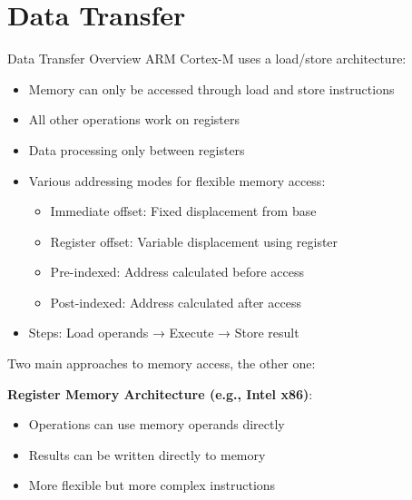 \section{Data Transfer}

\begin{concept}{Data Transfer Overview}
ARM Cortex-M uses a load/store architecture:
\begin{itemize}
  \item Memory can only be accessed through load and store instructions
  \item All other operations work on registers
  \item Data processing only between registers
  \item Various addressing modes for flexible memory access:
    \begin{itemize}
      \item Immediate offset: Fixed displacement from base
      \item Register offset: Variable displacement using register
      \item Pre-indexed: Address calculated before access
      \item Post-indexed: Address calculated after access
    \end{itemize}
    \item Steps: Load operands → Execute → Store result
\end{itemize}
\end{concept}

\begin{remark}
Two main approaches to memory access, the other one:

\textbf{Register Memory Architecture (e.g., Intel x86)}:
    \begin{itemize}
      \item Operations can use memory operands directly
      \item Results can be written directly to memory
      \item More flexible but more complex instructions
    \end{itemize}
\end{remark}

